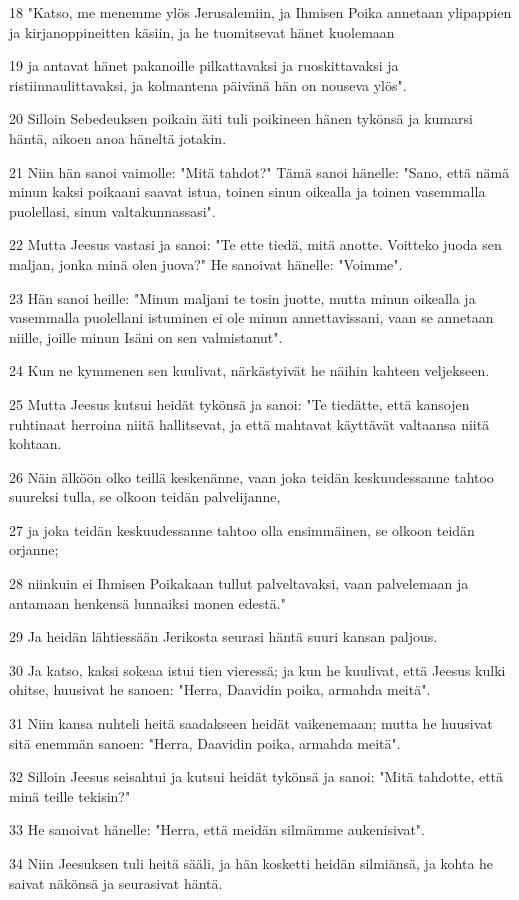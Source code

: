 \par 18 "Katso, me menemme ylös Jerusalemiin, ja Ihmisen Poika annetaan ylipappien ja kirjanoppineitten käsiin, ja he tuomitsevat hänet kuolemaan
\par 19 ja antavat hänet pakanoille pilkattavaksi ja ruoskittavaksi ja ristiinnaulittavaksi, ja kolmantena päivänä hän on nouseva ylös".
\par 20 Silloin Sebedeuksen poikain äiti tuli poikineen hänen tykönsä ja kumarsi häntä, aikoen anoa häneltä jotakin.
\par 21 Niin hän sanoi vaimolle: "Mitä tahdot?" Tämä sanoi hänelle: "Sano, että nämä minun kaksi poikaani saavat istua, toinen sinun oikealla ja toinen vasemmalla puolellasi, sinun valtakunnassasi".
\par 22 Mutta Jeesus vastasi ja sanoi: "Te ette tiedä, mitä anotte. Voitteko juoda sen maljan, jonka minä olen juova?" He sanoivat hänelle: "Voimme".
\par 23 Hän sanoi heille: "Minun maljani te tosin juotte, mutta minun oikealla ja vasemmalla puolellani istuminen ei ole minun annettavissani, vaan se annetaan niille, joille minun Isäni on sen valmistanut".
\par 24 Kun ne kymmenen sen kuulivat, närkästyivät he näihin kahteen veljekseen.
\par 25 Mutta Jeesus kutsui heidät tykönsä ja sanoi: "Te tiedätte, että kansojen ruhtinaat herroina niitä hallitsevat, ja että mahtavat käyttävät valtaansa niitä kohtaan.
\par 26 Näin älköön olko teillä keskenänne, vaan joka teidän keskuudessanne tahtoo suureksi tulla, se olkoon teidän palvelijanne,
\par 27 ja joka teidän keskuudessanne tahtoo olla ensimmäinen, se olkoon teidän orjanne;
\par 28 niinkuin ei Ihmisen Poikakaan tullut palveltavaksi, vaan palvelemaan ja antamaan henkensä lunnaiksi monen edestä."
\par 29 Ja heidän lähtiessään Jerikosta seurasi häntä suuri kansan paljous.
\par 30 Ja katso, kaksi sokeaa istui tien vieressä; ja kun he kuulivat, että Jeesus kulki ohitse, huusivat he sanoen: "Herra, Daavidin poika, armahda meitä".
\par 31 Niin kansa nuhteli heitä saadakseen heidät vaikenemaan; mutta he huusivat sitä enemmän sanoen: "Herra, Daavidin poika, armahda meitä".
\par 32 Silloin Jeesus seisahtui ja kutsui heidät tykönsä ja sanoi: "Mitä tahdotte, että minä teille tekisin?"
\par 33 He sanoivat hänelle: "Herra, että meidän silmämme aukenisivat".
\par 34 Niin Jeesuksen tuli heitä sääli, ja hän kosketti heidän silmiänsä, ja kohta he saivat näkönsä ja seurasivat häntä.

